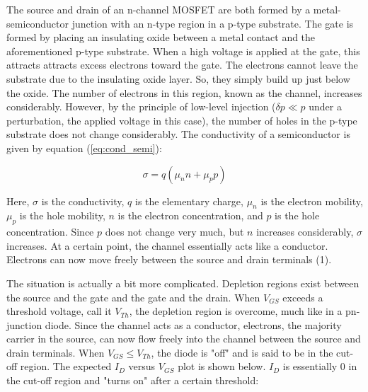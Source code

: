 The source and drain of an n-channel MOSFET are both formed by a metal-semiconductor junction with an n-type region in a p-type substrate. The gate is formed by placing an insulating oxide between a metal contact and the aforementioned p-type substrate. When a high voltage is applied at the gate, this attracts attracts excess electrons toward the gate. The electrons cannot leave the substrate due to the insulating oxide layer. So, they simply build up just below the oxide. The number of electrons in this region, known as the channel, increases considerably. However, by the principle of low-level injection ($\delta p \ll p$ under a perturbation, the applied voltage in this case), the number of holes in the p-type substrate does not change considerably. The conductivity of a semiconductor is given by equation (\ref{eq:cond_semi}):

\begin{equation}
	\label{eq:cond_semi}
	\sigma = q(\mu_n n + \mu_p p)
\end{equation}

Here, $\sigma$ is the conductivity, $q$ is the elementary charge, $\mu_n$ is the electron mobility, $\mu_p$ is the hole mobility, $n$ is the electron concentration, and $p$ is the hole concentration. Since $p$ does not change very much, but $n$ increases considerably, $\sigma$ increases. At a certain point, the channel essentially acts like a conductor. Electrons can now move freely between the source and drain terminals (1).

The situation is actually a bit more complicated. Depletion regions exist between the source and the gate and the gate and the drain. When $V_{GS}$ exceeds a threshold voltage, call it $V_{Th}$, the depletion region is overcome, much like in a pn-junction diode. Since the channel acts as a conductor, electrons, the majority carrier in the source, can now flow freely into the channel between the source and drain terminals. When $V_{GS} \leq V_{Th}$, the diode is "off" and is said to be in the cut-off region. The expected $I_D$ versus $V_{GS}$ plot is shown below. $I_D$ is essentially $0$ in the cut-off region and "turns on" after a certain threshold:

\FloatBarrier

